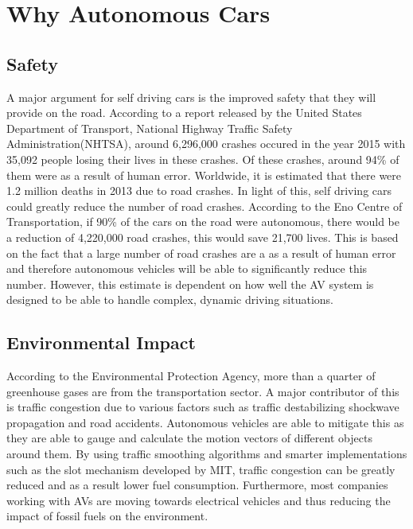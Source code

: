 \section{Why Autonomous Cars}

\subsection{Safety}
A major argument for self driving cars is the improved safety that they will provide on the road. According to a report released by the United States Department of Transport, National Highway Traffic Safety Administration(NHTSA), around 6,296,000 crashes occured in the year 2015 with 35,092 people losing their lives in these crashes. Of these crashes, around 94\% of them were as a result of human error. Worldwide, it is estimated that there were 1.2 million deaths in 2013 due to road crashes. 
In light of this, self driving cars could greatly reduce the number of road crashes. According to the Eno Centre of Transportation, if 90\% of the cars on the road were autonomous, there would be a reduction of 4,220,000 road crashes, this would save 21,700 lives. This is based on the fact that a large number of road crashes are a as a result of human error and therefore autonomous vehicles will be able to significantly reduce this number. 
However, this estimate is dependent on how well the AV system is designed to be able to handle complex, dynamic driving situations. 

\subsection{Environmental Impact}

According to the Environmental Protection Agency, more than a  quarter of greenhouse gases are from the transportation sector. A major contributor of this is traffic congestion due to various factors such as traffic destabilizing shockwave propagation and road accidents. Autonomous vehicles are able to mitigate this as they are able to gauge and calculate the motion vectors of different objects around them. By using traffic smoothing algorithms and smarter implementations such as the slot mechanism developed by MIT, traffic congestion can be greatly reduced and as a result lower fuel consumption. Furthermore, most companies working with AVs are moving towards electrical vehicles and thus reducing the impact of fossil fuels on the environment. 




